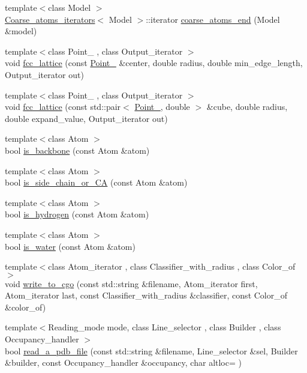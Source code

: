 \begin{DoxyCompactItemize}
{\footnotesize template$<$class Model $>$ }\\\hyperlink{structESBTL_1_1Coarse__atoms__iterators}{Coarse\+\_\+atoms\+\_\+iterators}$<$ Model $>$\+::iterator \hyperlink{group__grp__iters_ga1336e327e3310a72197278ab5b5017b0}{coarse\+\_\+atoms\+\_\+end} (Model \&model)
\item 
{\footnotesize template$<$class Point\+\_ , class Output\+\_\+iterator $>$ }\\void \hyperlink{namespaceESBTL_a2bf1e5e49229ef9ce0999ace4a6e0ca3}{fcc\+\_\+lattice} (const \hyperlink{classESBTL_1_1Point__3}{Point\+\_} \&center, double radius, double min\+\_\+edge\+\_\+length, Output\+\_\+iterator out)
\item 
{\footnotesize template$<$class Point\+\_ , class Output\+\_\+iterator $>$ }\\void \hyperlink{namespaceESBTL_ad9dfebcec80d58595aa44e77af294d88}{fcc\+\_\+lattice} (const std\+::pair$<$ \hyperlink{classESBTL_1_1Point__3}{Point\+\_}, double $>$ \&cube, double radius, double expand\+\_\+value, Output\+\_\+iterator out)
\item 
{\footnotesize template$<$class Atom $>$ }\\bool \hyperlink{namespaceESBTL_a4848989585f87e3953075f09a1089dec}{is\+\_\+backbone} (const Atom \&atom)
\item 
{\footnotesize template$<$class Atom $>$ }\\bool \hyperlink{namespaceESBTL_a117981ffccc18137b919af5c47a51b0d}{is\+\_\+side\+\_\+chain\+\_\+or\+\_\+\+CA} (const Atom \&atom)
\item 
{\footnotesize template$<$class Atom $>$ }\\bool \hyperlink{namespaceESBTL_ac05e26083da51353c81b8a27f0ea5580}{is\+\_\+hydrogen} (const Atom \&atom)
\item 
{\footnotesize template$<$class Atom $>$ }\\bool \hyperlink{namespaceESBTL_aa590c02ea198fef7fbdcf2dfbadb1223}{is\+\_\+water} (const Atom \&atom)
\item 
{\footnotesize template$<$class Atom\+\_\+iterator , class Classifier\+\_\+with\+\_\+radius , class Color\+\_\+of $>$ }\\void \hyperlink{namespaceESBTL_a8a7f5078d008c7d8cf741d33308224da}{write\+\_\+to\+\_\+cgo} (const std\+::string \&filename, Atom\+\_\+iterator first, Atom\+\_\+iterator last, const Classifier\+\_\+with\+\_\+radius \&classifier, const Color\+\_\+of \&color\+\_\+of)
\item 
{\footnotesize template$<$Reading\+\_\+mode mode, class Line\+\_\+selector , class Builder , class Occupancy\+\_\+handler $>$ }\\bool \hyperlink{namespaceESBTL_a850d3496f54d82687ff0109404cabd35}{read\+\_\+a\+\_\+pdb\+\_\+file} (const std\+::string \&filename, Line\+\_\+selector \&sel, Builder \&builder, const Occupancy\+\_\+handler \&occupancy, char altloc=\textquotesingle{} \textquotesingle{})

\end{DoxyCompactItemize}
